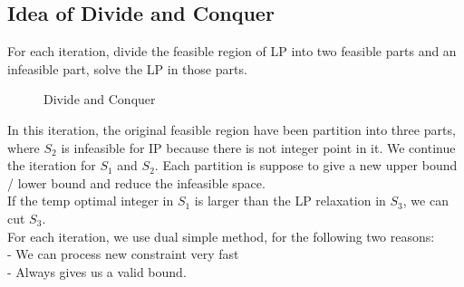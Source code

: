 			\subsection{Idea of Divide and Conquer}
				For each iteration, divide the feasible region of LP into two feasible parts and an infeasible part, solve the LP in those parts.\\
				\begin{figure}[!ht]
					\centering
					\caption{Divide and Conquer}
				\end{figure}
				In this iteration, the original feasible region have been partition into three parts, where $S_2$ is infeasible for IP because there is not integer point in it. We continue the iteration for $S_1$ and $S_2$. Each partition is suppose to give a new upper bound / lower bound and reduce the infeasible space.\\
				If the temp optimal integer in $S_1$ is larger than the LP relaxation in $S_3$, we can cut $S_3$.\\
				For each iteration, we use dual simple method, for the following two reasons:\\
				\indent - We can process new constraint very fast\\
				\indent - Always gives us a valid bound.\\

